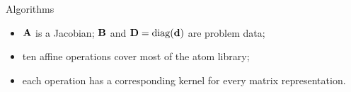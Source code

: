\documentclass[10pt,mathserif,aspectratio=169]{beamer}
\newcommand{\bul}{\setlength\itemsep{1.1ex}}
\newcommand{\fitfig}[1]{\adjustbox{max size={0.98\textwidth}{0.70\textheight}}{#1}}
\begin{document}
\begin{frame}{Algorithms}
\vspace{0.3ex}
\begin{itemize}\small\bul
  \item $\mathbf{A}$ is a {\color{polyblue}Jacobian}; $\mathbf{B}$ and
        $\mathbf{D} = \mathop{\mathrm{diag}}(\mathbf{d})$ are problem data;
  \item {\color{polyblue}ten affine operations cover most of the atom library};
  \item each operation has a corresponding kernel for every matrix representation.
\end{itemize}
\end{frame}

\end{document}
